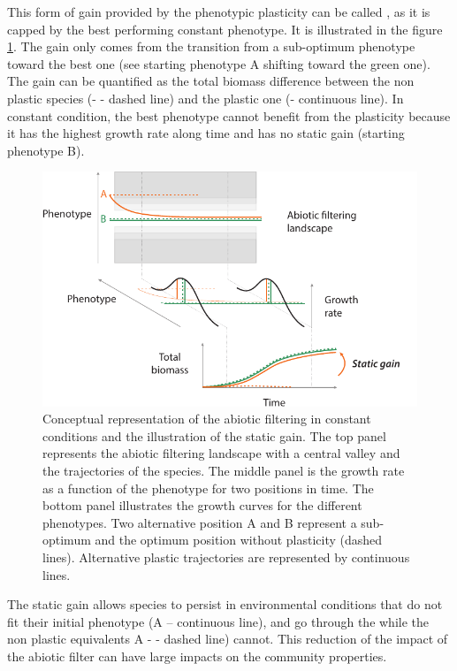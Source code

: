 This form of gain provided by the phenotypic plasticity can be called , as it is capped by the best performing constant phenotype. It is illustrated in the figure \ref{fig:filter}. The gain only comes from the transition from a sub-optimum phenotype toward the best one (see  \textcolor{myOrange}{starting phenotype A}  shifting toward the green one). The gain can be quantified as the total biomass difference between the non plastic species (- - dashed line) and the plastic one (- continuous line).  In constant condition, the best phenotype cannot benefit from the plasticity because it has the highest growth rate along time and has no static gain (\textcolor{myGreen}{starting phenotype B}). 


\begin{figure}\label{fig:filter}
\includegraphics[width = \textwidth]{./2_PP/Figures/Rain/filtering.pdf}
\caption[Abiotic filtering in constant conditions]{Conceptual representation of the abiotic filtering in constant conditions and the illustration of the static gain. The top panel represents the abiotic filtering landscape with a central valley and the trajectories of the species. The middle panel is the growth rate as a function of the phenotype for two positions in time. The bottom panel illustrates the growth curves for the different phenotypes. Two alternative position \textcolor{myOrange}{A} and \textcolor{myGreen}{B} represent a sub-optimum and the optimum position without plasticity (dashed lines). Alternative plastic trajectories are represented by continuous lines. }
\end{figure}

The static gain allows species to persist in environmental conditions that do not fit their initial phenotype (\textcolor{myOrange}{A -- continuous line}), and go through the  while the non plastic equivalents \textcolor{myOrange}{A - - dashed line}) cannot. This reduction of the impact of the abiotic filter can have large impacts on the community properties.

